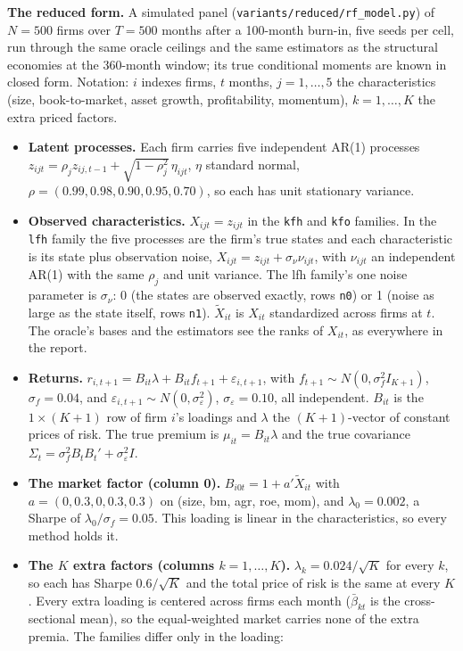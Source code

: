 \documentclass[11pt]{article}
\begin{document}
\noindent\textbf{The reduced form.} A simulated panel (\texttt{variants/reduced/rf\_model.py}) of $N=500$ firms over $T=500$ months after a 100-month burn-in, five seeds per cell, run through the same oracle ceilings and the same estimators as the structural economies at the 360-month window; its true conditional moments are known in closed form. Notation: $i$ indexes firms, $t$ months, $j=1,\dots,5$ the characteristics (size, book-to-market, asset growth, profitability, momentum), $k=1,\dots,K$ the extra priced factors.
\begin{itemize}
\item \textbf{Latent processes.} Each firm carries five independent AR(1) processes $z_{ijt}=\rho_j z_{ij,t-1}+\sqrt{1-\rho_j^2}\,\eta_{ijt}$, $\eta$ standard normal, $\rho=(0.99,0.98,0.90,0.95,0.70)$, so each has unit stationary variance.
\item \textbf{Observed characteristics.} $X_{ijt}=z_{ijt}$ in the \texttt{kfh} and \texttt{kfo} families. In the \texttt{lfh} family the five processes are the firm's true states and each characteristic is its state plus observation noise, $X_{ijt}=z_{ijt}+\sigma_\nu\nu_{ijt}$, with $\nu_{ijt}$ an independent AR(1) with the same $\rho_j$ and unit variance. The lfh family's one noise parameter is $\sigma_\nu$: 0 (the states are observed exactly, rows \texttt{n0}) or 1 (noise as large as the state itself, rows \texttt{n1}). $\tilde X_{it}$ is $X_{it}$ standardized across firms at $t$. The oracle's bases and the estimators see the ranks of $X_{it}$, as everywhere in the report.
\item \textbf{Returns.} $r_{i,t+1}=B_{it}\lambda+B_{it}f_{t+1}+\varepsilon_{i,t+1}$, with $f_{t+1}\sim N(0,\sigma_f^2 I_{K+1})$, $\sigma_f=0.04$, and $\varepsilon_{i,t+1}\sim N(0,\sigma_\varepsilon^2)$, $\sigma_\varepsilon=0.10$, all independent. $B_{it}$ is the $1\times(K+1)$ row of firm $i$'s loadings and $\lambda$ the $(K+1)$-vector of constant prices of risk. The true premium is $\mu_{it}=B_{it}\lambda$ and the true covariance $\Sigma_t=\sigma_f^2B_tB_t'+\sigma_\varepsilon^2 I$.
\item \textbf{The market factor (column 0).} $B_{i0t}=1+a'\tilde X_{it}$ with $a=(0,0.3,0,0.3,0.3)$ on (size, bm, agr, roe, mom), and $\lambda_0=0.002$, a Sharpe of $\lambda_0/\sigma_f=0.05$. This loading is linear in the characteristics, so every method holds it.
\item \textbf{The $K$ extra factors (columns $k=1,\dots,K$).} $\lambda_k=0.024/\sqrt{K}$ for every $k$, so each has Sharpe $0.6/\sqrt K$ and the total price of risk is the same at every $K$. Every extra loading is centered across firms each month ($\bar\beta_{kt}$ is the cross-sectional mean), so the equal-weighted market carries none of the extra premia. The families differ only in the loading:

\end{itemize}
\end{document}
